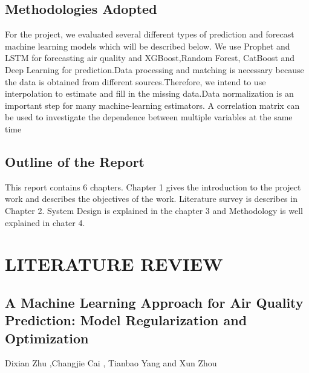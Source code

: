 \section{Methodologies Adopted}
For the project, we evaluated several different types of prediction and forecast machine learning  models which will be described below. We use Prophet and LSTM for forecasting air quality and XGBoost,Random Forest, CatBoost and Deep Learning for prediction.Data processing and matching is necessary because the data is obtained from diﬀerent sources.Therefore, we intend to use interpolation to estimate and ﬁll in the missing data.Data normalization is an important step for many machine-learning estimators. A correlation matrix can be used to investigate the dependence between multiple variables at the same time


\section{Outline of the Report}
This report contains 6 chapters. Chapter 1 gives the introduction to the project work and
describes the objectives of the work. Literature survey is describes in Chapter 2. System
Design is explained in the chapter 3 and Methodology  is well explained
in chater 4. 


\chapter{LITERATURE REVIEW}

\section{A Machine Learning Approach for Air Quality Prediction: Model Regularization and Optimization}

Dixian Zhu ,Changjie Cai , Tianbao Yang and Xun Zhou 

